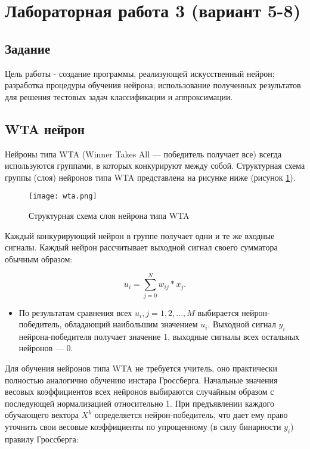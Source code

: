 \section{Лабораторная работа 3 (вариант 5-8)}

\subsection{Задание}
Цель работы - создание программы, реализующей искусственный нейрон; разработка процедуры обучения нейрона; использование полученных результатов для решения тестовых задач классификации и аппроксимации.

\subsection{WTA нейрон}
Нейроны типа WTA (Winner Takes All — победитель получает все) всегда используются группами, в которых конкурируют между собой. Структурная схема группы (слоя) нейронов типа WTA представлена на рисунке ниже (рисунок \ref{img:wta}).

\begin{figure}[H]
\centering
\texttt{[image: wta.png]}
\caption{Структурная схема слоя нейрона типа WTA}
\label{img:wta}
\end{figure}

Каждый конкурирующий нейрон в группе получает одни и те же входные сигналы. Каждый нейрон рассчитывает выходной сигнал своего сумматора обычным образом:

\begin{equation}\label{eq:minFunc}
	u_i=\sum\limits_{j=0}^N w_{ij}*x_j.
\end{equation}

\begin{itemize}
\item По результатам сравнения всех $u_i, j=1, 2, ..., M$ выбирается нейрон-победитель, обладающий наибольшим значением $u_i$. Выходной сигнал $y_i$ нейрона-победителя получает значение 1, выходные сигналы всех остальных нейронов — 0.
\end{itemize}

Для обучения нейронов типа WTA не требуется учитель, оно практически полностью аналогично обучению инстара Гроссберга. Начальные значения весовых коэффициентов всех нейронов выбираются случайным образом с последующей нормализацией относительно 1.
При предъявлении каждого обучающего вектора $X^k$ определяется нейрон-победитель, что дает ему право уточнить свои весовые коэффициенты по упрощенному (в силу бинарности $y_i$) правилу Гроссберга:

